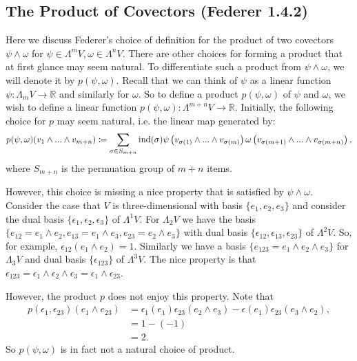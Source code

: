 \subsection{The Product of Covectors (Federer 1.4.2)}

Here we discuss Federer's choice of definition for the product of two covectors \(\psi  \wedge \omega\) for \(\psi \in \Lambda^m V, \omega \in \Lambda^n V\). There are other choices for
forming a product that at first glance may seem natural. To differentiate such a product from \(\psi \wedge \omega\), we will denote it by \(p(\psi, \omega)\). Recall that
we can think of \(\psi\) as a linear function \(\psi: \Lambda_m V \to \mathbb R\) and similarly for \(\omega\). So to define a product \(p(\psi, \omega)\) of
\(\psi\) and \(\omega\), we wish to define a linear function \(p(\psi, \omega): \Lambda^{m+n} V \to \mathbb R\). Initially, the following choice for \(p\) may seem natural,
i.e. the linear map generated by:
\begin{equation}
p(\psi, \omega)(v_1 \wedge ... \wedge v_{m+n}) \coloneqq
    \sum\limits_{\sigma \in S_{m+n}} \operatorname{ind}(\sigma) \psi\left(v_{\sigma(1)} \wedge ... \wedge v_{\sigma(m)} \right) \omega\left(v_{\sigma(m+1)} \wedge ... \wedge v_{\sigma(m + n)}\right),
\end{equation}
where \(S_{m+n}\) is the permuation group of \(m + n\) items.

However, this choice is missing a nice property that is satisfied by \(\psi \wedge \omega\). Consider the case that \(V\) is three-dimensional with basis \(\{e_1, e_2, e_3\}\) and
consider the dual basis \(\{\epsilon_1, \epsilon_2, \epsilon_3\}\) of \(\Lambda^1 V\). For \(\Lambda_2 V\) we have the basis
\(\{e_{12} = e_1 \wedge e_2, e_{13} = e_1 \wedge e_3, e_{23} = e_2 \wedge e_3\}\) with
dual basis \(\{\epsilon_{12}, \epsilon_{13}, \epsilon_{23}\}\) of \(\Lambda^2 V\). So, for example, \(\epsilon_{12}(e_1 \wedge e_2) = 1\). Similarly we have a basis
\(\{e_{123} = e_1 \wedge e_2 \wedge e_3\}\) for \(\Lambda_3 V\) and dual basis \(\{\epsilon_{123}\}\) of \(\Lambda^3 V\). The nice property is that 
\(\epsilon_{123} = \epsilon_1 \wedge \epsilon_2 \wedge \epsilon_3 = \epsilon_1 \wedge \epsilon_{23}\).

However, the product \(p\) does not enjoy this property. Note that 
\begin{align}
p(\epsilon_1, \epsilon_{23})( e_1\wedge e_{23} ) & =  \epsilon_1(e_1) \epsilon_{23}(e_2 \wedge e_3) - \epsilon(e_1) \epsilon_{23}(e_3 \wedge e_2), \\
    & = 1 - (-1) \\
    & = 2.
\end{align}
So \(p(\psi, \omega)\) is in fact not a natural choice of product.

